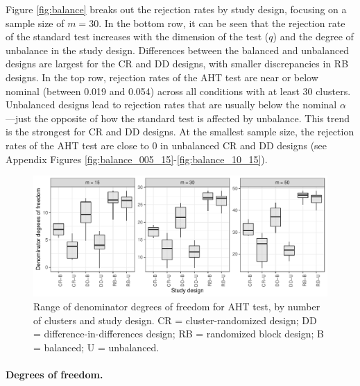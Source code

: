 \documentclass[12pt]{article}
\begin{document}
Figure \ref{fig:balance} breaks out the rejection rates by study design,
focusing on a sample size of \(m = 30\). In the bottom row, it can be
seen that the rejection rate of the standard test increases with the
dimension of the test (\(q\)) and the degree of unbalance in the study
design. Differences between the balanced and unbalanced designs are
largest for the CR and DD designs, with smaller discrepancies in RB
designs. In the top row, rejection rates of the AHT test are near or
below nominal (between 0.019 and 0.054) across all conditions with at
least 30 clusters. Unbalanced designs lead to rejection rates that are
usually below the nominal \(\alpha\)---just the opposite of how the
standard test is affected by unbalance. This trend is the strongest for
CR and DD designs. At the smallest sample size, the rejection rates of
the AHT test are close to 0 in unbalanced CR and DD designs (see
Appendix Figures \ref{fig:balance_005_15}-\ref{fig:balance_10_15}).

\begin{figure}

{\centering \includegraphics[width=\linewidth]{CR_fig/df-1} 

}

\caption{Range of denominator degrees of freedom for AHT test, by number of clusters and study design. CR = cluster-randomized design; DD = difference-in-differences design; RB = randomized block design; B = balanced; U = unbalanced.}\label{fig:df}
\end{figure}

\hypertarget{degrees-of-freedom.}{%
\paragraph{Degrees of freedom.}\label{degrees-of-freedom.}}
\end{document}
